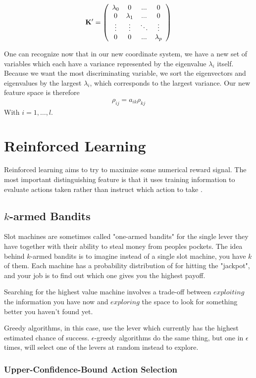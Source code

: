 $$\bf{K}' = \left(
{\begin{array}{cccc}
\lambda_0 & 0 &...&0 \\
0 & \lambda_1 & ...&0\\
\vdots & \vdots &\ddots & \vdots \\
0 & 0 & ... &\lambda_p
\end{array}}
\right)
$$

One can recognize now that in our new coordinate system, we have a new set of variables which each have a variance represented by the eigenvalue $\lambda_i$ itself. Because we want the most discriminating variable, we sort the eigenvectors and eigenvalues by the largest $\lambda_i$, which corresponds to the largest variance. Our new feature space is therefore
\begin{align}
	\rho_{ij} = a_{ik}\rho_{kj}
\end{align}
With $i=1,\dots,l$.


\section{Reinforced Learning}
Reinforced learning aims to try to maximize some numerical reward signal. The most important distinguishing feature is that it uses training information to evaluate actions taken rather than instruct which action to take \cite{sutton}.


\subsection{$k$-armed Bandits}
Slot machines are sometimes called "one-armed bandits" for the single lever they have together with their ability to steal money from peoples pockets. The idea behind $k$-armed bandits is to imagine instead of a single slot machine, you have $k$ of them. Each machine has a probability distribution of for hitting the "jackpot", and your job is to find out which one gives you the highest payoff.

Searching for the highest value machine involves a trade-off between $exploiting$ the information you have now and $exploring$ the space to look for something better you haven't found yet.

Greedy algorithms, in this case, use the lever which currently has the highest estimated chance of success. $\epsilon$-greedy algorithms do the same thing, but one in $\epsilon$ times, will select one of the levers at random instead to explore.


\subsubsection{Upper-Confidence-Bound Action Selection}

